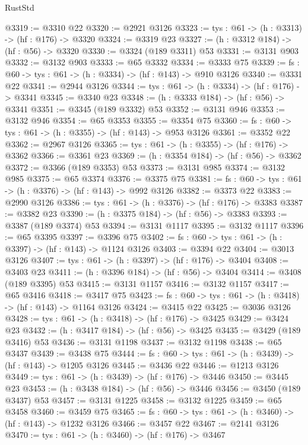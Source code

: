 \begin{lexlean}{RustStd}
\begin{coremodule}
{\begin{coremodule}
{{{{{{{{{{{{@3319 := @3310 @22
@3320 := @2921 @3126
@3323 := {tys : @61} -> (h : @3313) -> (hf : @176) -> @3320
@3324 := @3319 @23
@3327 := (h : @3312 @184) -> (hf : @56) -> @3320
@3330 := @3324 (@189 @3311) @53
@3331 := @3131 @903
@3332 := @3132 @903
@3333 := @65 @3332
@3334 := @3333 @75
@3339 := {fs : @60} -> {tys : @61} -> (h : @3334) -> (hf : @143) -> @910 @3126
@3340 := @3331 @22
@3341 := @2944 @3126
@3344 := {tys : @61} -> (h : @3334) -> (hf : @176) -> @3341
@3345 := @3340 @23
@3348 := (h : @3333 @184) -> (hf : @56) -> @3341
@3351 := @3345 (@189 @3332) @53
@3352 := @3131 @946
@3353 := @3132 @946
@3354 := @65 @3353
@3355 := @3354 @75
@3360 := {fs : @60} -> {tys : @61} -> (h : @3355) -> (hf : @143) -> @953 @3126
@3361 := @3352 @22
@3362 := @2967 @3126
@3365 := {tys : @61} -> (h : @3355) -> (hf : @176) -> @3362
@3366 := @3361 @23
@3369 := (h : @3354 @184) -> (hf : @56) -> @3362
@3372 := @3366 (@189 @3353) @53
@3373 := @3131 @985
@3374 := @3132 @985
@3375 := @65 @3374
@3376 := @3375 @75
@3381 := {fs : @60} -> {tys : @61} -> (h : @3376) -> (hf : @143) -> @992 @3126
@3382 := @3373 @22
@3383 := @2990 @3126
@3386 := {tys : @61} -> (h : @3376) -> (hf : @176) -> @3383
@3387 := @3382 @23
@3390 := (h : @3375 @184) -> (hf : @56) -> @3383
@3393 := @3387 (@189 @3374) @53
@3394 := @3131 @1117
@3395 := @3132 @1117
@3396 := @65 @3395
@3397 := @3396 @75
@3402 := {fs : @60} -> {tys : @61} -> (h : @3397) -> (hf : @143) -> @1124 @3126
@3403 := @3394 @22
@3404 := @3013 @3126
@3407 := {tys : @61} -> (h : @3397) -> (hf : @176) -> @3404
@3408 := @3403 @23
@3411 := (h : @3396 @184) -> (hf : @56) -> @3404
@3414 := @3408 (@189 @3395) @53
@3415 := @3131 @1157
@3416 := @3132 @1157
@3417 := @65 @3416
@3418 := @3417 @75
@3423 := {fs : @60} -> {tys : @61} -> (h : @3418) -> (hf : @143) -> @1164 @3126
@3424 := @3415 @22
@3425 := @3036 @3126
@3428 := {tys : @61} -> (h : @3418) -> (hf : @176) -> @3425
@3429 := @3424 @23
@3432 := (h : @3417 @184) -> (hf : @56) -> @3425
@3435 := @3429 (@189 @3416) @53
@3436 := @3131 @1198
@3437 := @3132 @1198
@3438 := @65 @3437
@3439 := @3438 @75
@3444 := {fs : @60} -> {tys : @61} -> (h : @3439) -> (hf : @143) -> @1205 @3126
@3445 := @3436 @22
@3446 := @1213 @3126
@3449 := {tys : @61} -> (h : @3439) -> (hf : @176) -> @3446
@3450 := @3445 @23
@3453 := (h : @3438 @184) -> (hf : @56) -> @3446
@3456 := @3450 (@189 @3437) @53
@3457 := @3131 @1225
@3458 := @3132 @1225
@3459 := @65 @3458
@3460 := @3459 @75
@3465 := {fs : @60} -> {tys : @61} -> (h : @3460) -> (hf : @143) -> @1232 @3126
@3466 := @3457 @22
@3467 := @2141 @3126
@3470 := {tys : @61} -> (h : @3460) -> (hf : @176) -> @3467
}}}}}}}}}}}}
\end{coremodule}}
\end{coremodule}
\end{lexlean}
